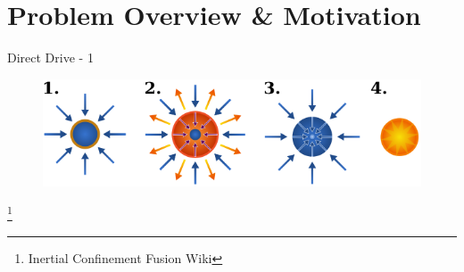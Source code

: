 
\begin{frame}[t,plain]
  \titlepage
\end{frame}

\section{Problem Overview \& Motivation}

%
\begin{frame}[t, label=current]{Direct Drive - 1}
 \begin{figure}[!htbp]
   \includegraphics[width=0.8\linewidth]{fig/600pxICF.png}
   \centering
 \end{figure}
 \footnote{Inertial Confinement Fusion Wiki}
\end{frame}


